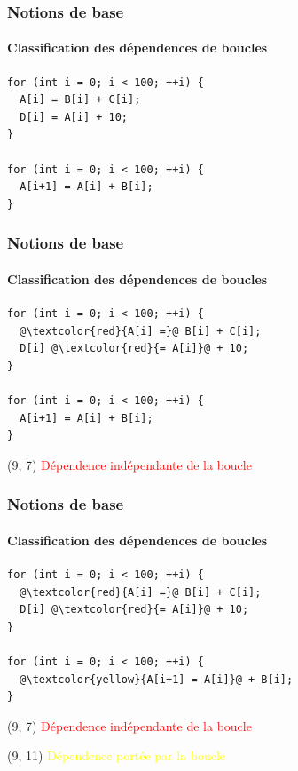 \documentclass{beamer}
\begin{document}
\begin{frame}[fragile]
\frametitle{Notions de base}
\framesubtitle{Classification des dépendences de boucles}
\begin{lstlisting}
for (int i = 0; i < 100; ++i) {
  A[i] = B[i] + C[i];
  D[i] = A[i] + 10;
}

for (int i = 0; i < 100; ++i) {
  A[i+1] = A[i] + B[i];
}
\end{lstlisting}
\end{frame}

\begin{frame}[fragile]
\frametitle{Notions de base}
\framesubtitle{Classification des dépendences de boucles}
\begin{lstlisting}
for (int i = 0; i < 100; ++i) {
  @\textcolor{red}{A[i] =}@ B[i] + C[i];
  D[i] @\textcolor{red}{= A[i]}@ + 10;
}

for (int i = 0; i < 100; ++i) {
  A[i+1] = A[i] + B[i];
}
\end{lstlisting}

\begin{textblock}{5.5}(9, 7)
	\textcolor{red}{Dépendence indépendante de la boucle}
\end{textblock}
\end{frame}

\begin{frame}[fragile]
\frametitle{Notions de base}
\framesubtitle{Classification des dépendences de boucles}
\begin{lstlisting}
for (int i = 0; i < 100; ++i) {
  @\textcolor{red}{A[i] =}@ B[i] + C[i];
  D[i] @\textcolor{red}{= A[i]}@ + 10;
}

for (int i = 0; i < 100; ++i) {
  @\textcolor{yellow}{A[i+1] = A[i]}@ + B[i];
}
\end{lstlisting}

\begin{textblock}{5.5}(9, 7)
	\textcolor{red}{Dépendence indépendante de la boucle}
\end{textblock}

\begin{textblock}{5}(9, 11)
	\textcolor{yellow}{Dépendence portée par la boucle}
\end{textblock}
\end{frame}
\end{document}
